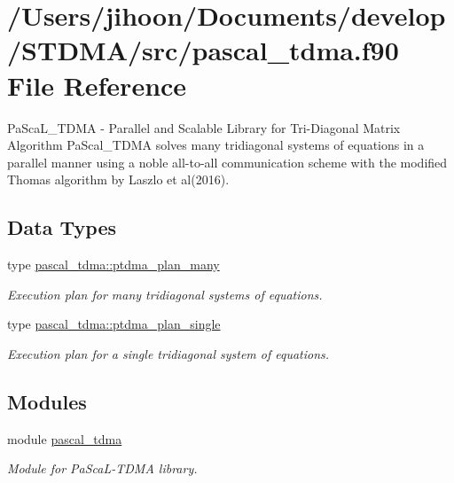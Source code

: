 \hypertarget{pascal__tdma_8f90}{}\section{/\+Users/jihoon/\+Documents/develop/\+S\+T\+D\+M\+A/src/pascal\+\_\+tdma.f90 File Reference}
\label{pascal__tdma_8f90}


Pa\+Sca\+L\+\_\+\+T\+D\+MA -\/ Parallel and Scalable Library for Tri-\/\+Diagonal Matrix Algorithm Pa\+Scal\+\_\+\+T\+D\+MA solves many tridiagonal systems of equations in a parallel manner using a noble all-\/to-\/all communication scheme with the modified Thomas algorithm by Laszlo et al(2016).  


\subsection*{Data Types}
\begin{DoxyCompactItemize}
\item 
type \mbox{\hyperlink{structpascal__tdma_1_1ptdma__plan__many}{pascal\+\_\+tdma\+::ptdma\+\_\+plan\+\_\+many}}
\begin{DoxyCompactList}\small\item\em Execution plan for many tridiagonal systems of equations. \end{DoxyCompactList}\item 
type \mbox{\hyperlink{structpascal__tdma_1_1ptdma__plan__single}{pascal\+\_\+tdma\+::ptdma\+\_\+plan\+\_\+single}}
\begin{DoxyCompactList}\small\item\em Execution plan for a single tridiagonal system of equations. \end{DoxyCompactList}\end{DoxyCompactItemize}
\subsection*{Modules}
\begin{DoxyCompactItemize}
\item 
module \mbox{\hyperlink{namespacepascal__tdma}{pascal\+\_\+tdma}}
\begin{DoxyCompactList}\small\item\em Module for Pa\+Sca\+L-\/\+T\+D\+MA library. \end{DoxyCompactList}\end{DoxyCompactItemize}
